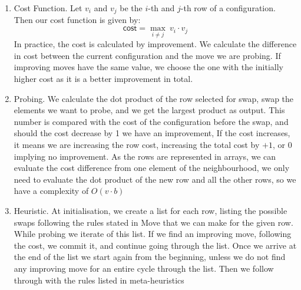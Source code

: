 \begin{enumerate}
\item Cost Function. Let $v_i$ and $v_j$ be the $i$-th and $j$-th row of a configuration. Then our cost function is given by: 
\begin{equation*}
 \mathsf{cost} = \max_{i \neq j}\: v_i \cdot v_j 
\end{equation*}
In practice, the cost is  calculated by improvement. We calculate the difference in cost between the current configuration and the move we are probing. If improving moves have the same value, we choose the one with the initially higher cost as it is a better improvement in total. 
\item Probing.  
We calculate the dot product of the row selected for swap, swap the elements we want to probe, and we get the largest product as output. This number is compared with the cost of the configuration before the swap, and should the cost decrease by 1 we have an improvement, If the cost increases, it means we are increasing the row cost, increasing the total cost by $+1$, or $0$ implying no improvement. 
As the rows are represented in arrays, we can evaluate the cost difference from one element of the neighbourhood, we only need to evaluate the dot product of the new row and all the other rows, so we have a complexity of $O(v \cdot b)$
\item Heuristic. At initialisation, we create a list for each row, listing the possible swaps following the rules stated in Move that we can make for the given row. While probing we iterate of this list. If we find an improving move, following the cost, we commit it, and continue going through the list. Once we arrive at the end of the list we start again from the beginning, unless we do not find any improving move for an entire cycle through the list. Then we follow through with the rules listed in meta-heuristics

\end{enumerate}

